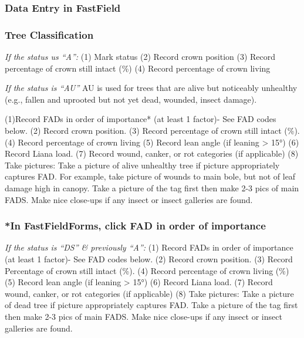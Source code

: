 \documentclass[
]{article}
\begin{document}
\hypertarget{data-entry-in-fastfield}{%
\subsubsection{Data Entry in FastField}\label{data-entry-in-fastfield}}

\hypertarget{tree-classification}{%
\subsubsection{Tree Classification}\label{tree-classification}}

\emph{If the status us ``A'':} (1) Mark status (2) Record crown position
(3) Record percentage of crown still intact (\%) (4) Record percentage
of crown living

\emph{If the status is ``AU''} AU is used for trees that are alive but
noticeably unhealthy (e.g., fallen and uprooted but not yet dead,
wounded, insect damage).

(1)Record FADs in order of importance* (at least 1 factor)- See FAD
codes below. (2) Record crown position. (3) Record percentage of crown
still intact (\%). (4) Record percentage of crown living (5) Record lean
angle (if leaning \textgreater{} 15°) (6) Record Liana load. (7) Record
wound, canker, or rot categories (if applicable) (8) Take pictures: Take
a picture of alive unhealthy tree if picture appropriately captures FAD.
For example, take picture of wounds to main bole, but not of leaf damage
high in canopy. Take a picture of the tag first then make 2-3 pics of
main FADS. Make nice close-ups if any insect or insect galleries are
found.

\hypertarget{in-fastfieldforms-click-fad-in-order-of-importance}{%
\subsubsection{*In FastFieldForms, click FAD in order of
importance}\label{in-fastfieldforms-click-fad-in-order-of-importance}}

\emph{If the status is ``DS'' \& previously ``A'':} (1) Record FADs in
order of importance (at least 1 factor)- See FAD codes below. (2) Record
crown position. (3) Record Percentage of crown still intact (\%). (4)
Record percentage of crown living (\%) (5) Record lean angle (if leaning
\textgreater{} 15°) (6) Record Liana load. (7) Record wound, canker, or
rot categories (if applicable) (8) Take pictures: Take a picture of dead
tree if picture appropriately captures FAD. Take a picture of the tag
first then make 2-3 pics of main FADS. Make nice close-ups if any insect
or insect galleries are found.
\end{document}
